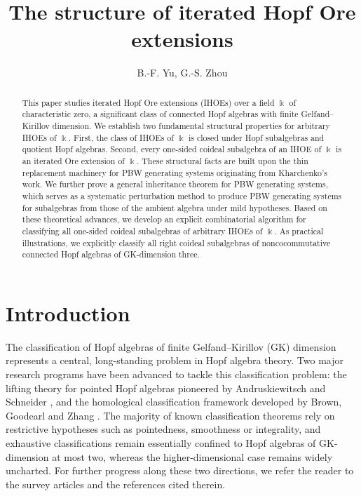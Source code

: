 \documentclass{article}
\title{The structure of iterated Hopf Ore extensions}
\author{B.-F. Yu, G.-S. Zhou}
\date{}
\theoremstyle{plain}
\theoremstyle{definition}
\numberwithin{equation}{section}
\begin{document}
	\maketitle
	
	
	\begin{abstract}
		This paper studies iterated Hopf Ore extensions (IHOEs) over a field $\Bbbk$ of characteristic zero, a significant class of connected Hopf algebras with finite Gelfand–Kirillov dimension. We  establish two fundamental structural properties for arbitrary IHOEs of $\Bbbk$. First, the class of IHOEs of $\Bbbk$ is closed under Hopf subalgebras and quotient Hopf algebras. Second, every one-sided coideal subalgebra of an IHOE of $\Bbbk$ is an iterated Ore extension of $\Bbbk$. These structural facts are built upon the thin replacement machinery for PBW generating systems originating from Kharchenko’s work. We further prove a general inheritance theorem for PBW generating systems, which serves as a systematic perturbation method to produce PBW generating systems for subalgebras from those of the ambient algebra under mild hypotheses. Based on these theoretical advances, we develop an explicit combinatorial algorithm for  classifying  all one-sided coideal subalgebras of arbitrary IHOEs of $\Bbbk$. As practical illustrations, we explicitly classify all right coideal subalgebras of noncocommutative connected Hopf algebras of GK-dimension three.
	\end{abstract}
	
	
	\section{Introduction}
	
	
	
	The classification of Hopf algebras of finite Gelfand–Kirillov (GK) dimension represents a central, long-standing problem in Hopf algebra theory. Two major research programs have been advanced to tackle this classification problem: the lifting theory for pointed Hopf algebras pioneered by Andruskiewitsch and Schneider \cite{AS02,AS10}, and the homological classification framework developed by Brown, Goodearl and Zhang \cite{BZ08,GZ10}. The majority of known classification theorems rely on restrictive hypotheses such as pointedness, smoothness or integrality, and exhaustive classifications remain essentially confined to Hopf algebras of GK-dimension at most two, whereas the higher-dimensional case remains widely uncharted. For further progress along these two directions, we refer the reader to the survey articles \cite{An25,AA17,BZ21} and the references cited therein.
	
\end{document}
